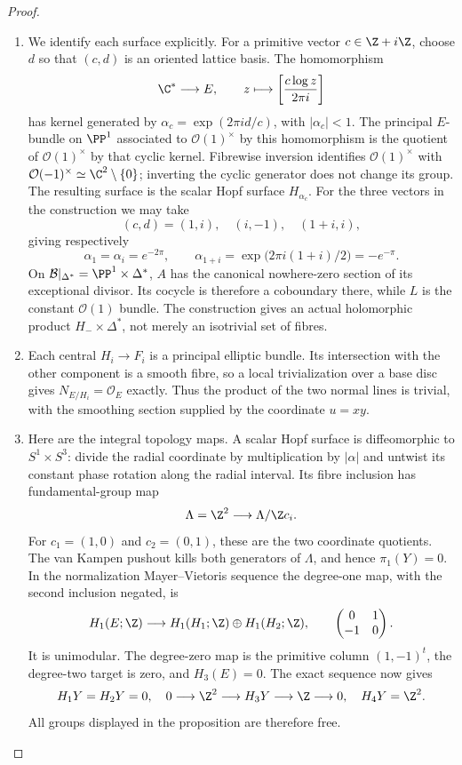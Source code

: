 \begin{proof}
\begin{enumerate}[label=\arabic*.,leftmargin=*]
\item We identify each surface explicitly.  For a primitive vector
$c\in\Z+i\Z$, choose $d$ so that $(c,d)$ is an oriented
lattice basis.  The homomorphism
\[
 \C^*\longrightarrow E,\qquad
 z\longmapsto\left[\frac{c\log z}{2\pi i}\right]
\]
has kernel generated by
$\alpha_c=\exp(2\pi i d/c)$, with $|\alpha_c|<1$.
The principal $E$-bundle on $\PP^1$ associated to
$\mathcal O(1)^\times$ by this homomorphism is the quotient
of $\mathcal O(1)^\times$ by that cyclic kernel.  Fibrewise
inversion identifies $\mathcal O(1)^\times$ with
$\mathcal O(-1)^\times\simeq\C^2\setminus\{0\}$;
inverting the cyclic generator does not change its group.
The resulting surface is the scalar Hopf surface $H_{\alpha_c}$.
For the three vectors in the construction we may take
\[
 (c,d)=(1,i),\quad(i,-1),\quad(1+i,i),
\]
giving respectively
\[
 \alpha_1=\alpha_i=e^{-2\pi},\qquad
 \alpha_{1+i}=\exp\bigl(2\pi i(1+i)/2\bigr)=-e^{-\pi}.
\]
On $\mathcal B|_{\Delta^*}=\PP^1\times\Delta^*$,
$A$ has the canonical nowhere-zero section of its exceptional
divisor.  Its cocycle is therefore a coboundary there, while
$L$ is the constant $\mathcal O(1)$ bundle.  The construction
gives an actual holomorphic product $H_-\times\Delta^*$,
not merely an isotrivial set of fibres.

\item Each central $H_i\to F_i$ is a principal elliptic bundle.
Its intersection with the other component is a smooth fibre,
so a local trivialization over a base disc gives
$N_{E/H_i}=\mathcal O_E$ exactly.  Thus the product of the
two normal lines is trivial, with the smoothing section supplied
by the coordinate $u=xy$.

\item Here are the integral topology maps.  A scalar Hopf surface is
diffeomorphic to $S^1\times S^3$: divide the radial coordinate
by multiplication by $|\alpha|$ and untwist its constant phase
rotation along the radial interval.  Its fibre inclusion has
fundamental-group map
\[
 \Lambda=\Z^2\longrightarrow\Lambda/\Z c_i.
\]
For $c_1=(1,0)$ and $c_2=(0,1)$, these are the two coordinate
quotients.  The van Kampen pushout kills both generators of
$\Lambda$, and hence $\pi_1(Y)=0$.  In the normalization
Mayer--Vietoris sequence the degree-one map, with the second
inclusion negated, is
\[
 H_1(E;\Z)\longrightarrow H_1(H_1;\Z)\oplus H_1(H_2;\Z),
 \qquad \begin{pmatrix}0&1\\-1&0\end{pmatrix}.
\]
It is unimodular.  The degree-zero map is the primitive column
$(1,-1)^t$, the degree-two target is zero, and $H_3(E)=0$.
The exact sequence now gives
\[
 H_1Y=H_2Y=0,\quad
 0\longrightarrow\Z^2\longrightarrow H_3Y
       \longrightarrow\Z\longrightarrow0,
 \quad H_4Y=\Z^2.
\]
All groups displayed in the proposition are therefore free.


\end{enumerate}
\end{proof}

